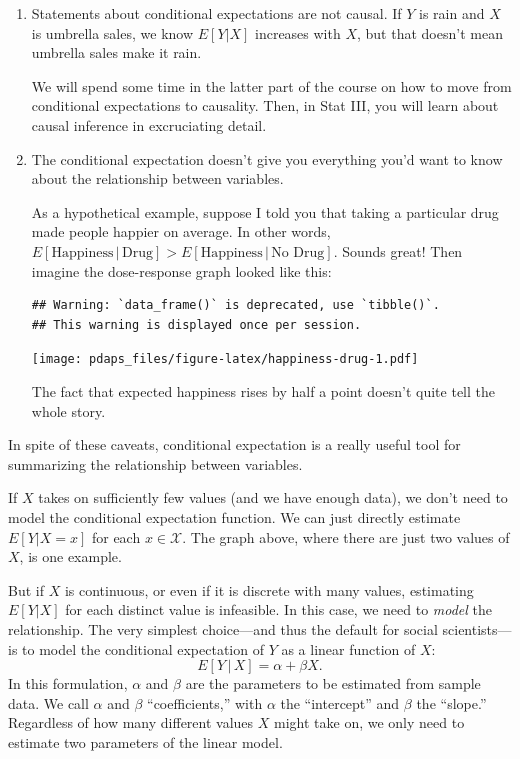 \documentclass[
  12pt,
  oneside,openany]{book}
\begin{document}
\begin{enumerate}
\def\labelenumi{\arabic{enumi}.}
\item
  Statements about conditional expectations are not causal. If \(Y\) is rain and \(X\) is umbrella sales, we know \(E[Y | X]\) increases with \(X\), but that doesn't mean umbrella sales make it rain.

  We will spend some time in the latter part of the course on how to move from conditional expectations to causality. Then, in Stat III, you will learn about causal inference in excruciating detail.
\item
  The conditional expectation doesn't give you everything you'd want to know about the relationship between variables.

  As a hypothetical example, suppose I told you that taking a particular drug made people happier on average. In other words, \(E[\text{Happiness} \,|\, \text{Drug}] > E[\text{Happiness} \,|\, \text{No Drug}]\). Sounds great! Then imagine the dose-response graph looked like this:

\begin{verbatim}
## Warning: `data_frame()` is deprecated, use `tibble()`.
## This warning is displayed once per session.
\end{verbatim}

  \texttt{[image: pdaps\_files/figure-latex/happiness-drug-1.pdf]}

  The fact that expected happiness rises by half a point doesn't quite tell the whole story.
\end{enumerate}

In spite of these caveats, conditional expectation is a really useful tool for summarizing the relationship between variables.

If \(X\) takes on sufficiently few values (and we have enough data), we don't need to model the conditional expectation function. We can just directly estimate \(E[Y | X = x]\) for each \(x \in \mathcal{X}\). The graph above, where there are just two values of \(X\), is one example.

But if \(X\) is continuous, or even if it is discrete with many values, estimating \(E[Y | X]\) for each distinct value is infeasible. In this case, we need to \emph{model} the relationship. The very simplest choice---and thus the default for social scientists---is to model the conditional expectation of \(Y\) as a linear function of \(X\):
\begin{equation}
E[Y \,|\, X] = \alpha + \beta X.
\end{equation}
In this formulation, \(\alpha\) and \(\beta\) are the parameters to be estimated from sample data. We call \(\alpha\) and \(\beta\) ``coefficients,'' with \(\alpha\) the ``intercept'' and \(\beta\) the ``slope.'' Regardless of how many different values \(X\) might take on, we only need to estimate two parameters of the linear model.
\end{document}
